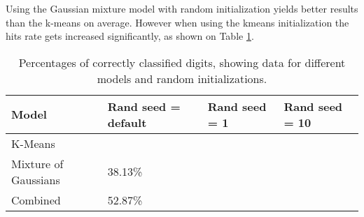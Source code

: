 \documentclass[12pt]{article}
\begin{document}
Using the Gaussian mixture model with random initialization yields better results than the k-means on average. 
However when using the kmeans initialization the hits rate gets increased significantly, as shown on 
Table \ref{tab:results}.

\begin{table}[h]
\caption[Table caption text]{Percentages of correctly classified digits, showing data for different models and random initializations.}
\label{tab:results}
\begin{tabular}{|l|l|l|l|}
\hline
Model                 & Rand seed = default & Rand seed = 1 & Rand seed = 10 \\ \hline
K-Means               &                     &               &                \\ \hline
Mixture of  Gaussians & 38.13\%             &               &                \\ \hline
Combined              & 52.87\%             &               &                \\ \hline
\end{tabular}
\end{table}
 
\end{document}
